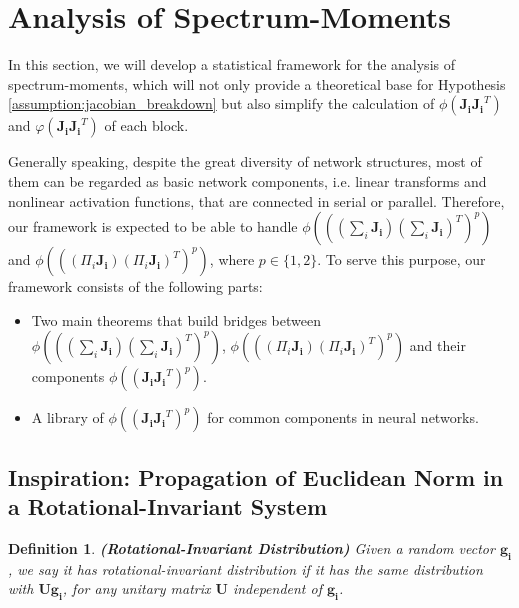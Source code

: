 \documentclass[10pt,journal,compsoc]{IEEEtran}
\newtheorem{definition}{Definition}[section]
\begin{document}
\section{Analysis of Spectrum-Moments}\label{sec:analysis_spectrum_moment}
In this section, we will develop a statistical framework for the analysis of spectrum-moments, which will not only provide a theoretical base for Hypothesis \ref{assumption:jacobian_breakdown} but also simplify the calculation of $\phi(\mathbf{J_iJ_i}^T)$ and $\varphi(\mathbf{J_iJ_i}^T)$ of each block. 

Generally speaking, despite the great diversity of network structures, most of them can be regarded as basic network components, i.e. linear transforms and nonlinear activation functions, that are connected in serial or parallel. Therefore, our framework is expected to be able to handle $\phi\left(\left(\left(\sum_i \mathbf{J_i}\right)\left(\sum_i \mathbf{J_i}\right)^T\right)^p\right)$ and $\phi\left(\left(\left(\Pi_i \mathbf{J_i}\right)\left(\Pi_i \mathbf{J_i}\right)^T\right)^p\right)$, where $p\in\{1,2\}$. 
To serve this purpose, our framework consists of the following parts:
\begin{itemize}
    \item Two main theorems that build bridges between $\phi\!\left(\!\left(\left(\sum_i \mathbf{J_i}\right)\!\left(\sum_i \mathbf{J_i}\right)^T\right)^p\right)$, $\phi\!\left(\!\left(\left(\Pi_i \mathbf{J_i}\right)\!\left(\Pi_i \mathbf{J_i}\right)^T\right)^p\right)$ and their components $\phi\left(\left(\mathbf{J_iJ_i}^T\right)^p\right)$.
    \item A library of $\phi\left(\left(\mathbf{J_iJ_i}^T\right)^p\right)$ for common components in neural networks.
\end{itemize}
\vspace{-10pt}
\subsection{Inspiration: Propagation of Euclidean Norm in a Rotational-Invariant System}\label{sec:inspiration}

\begin{definition}
\textbf{(Rotational-Invariant Distribution)} Given a random vector $\mathbf{g_i}$, we say it has rotational-invariant distribution if it has the same distribution with $\mathbf{Ug_i}$, for any unitary matrix $\mathbf{U}$ independent of $\mathbf{g_i}$.
\label{def:rotational_invariant_distribution}
\end{definition}
\end{document}
